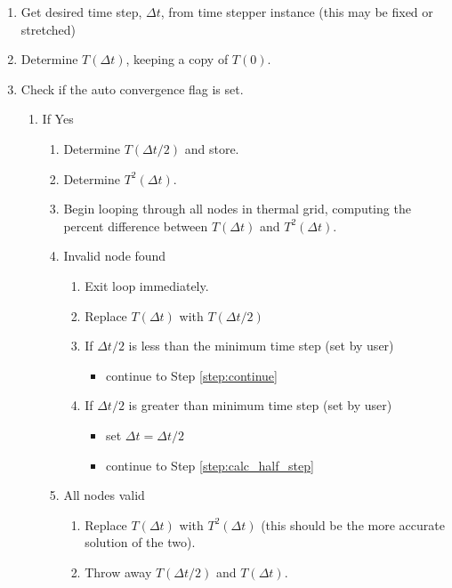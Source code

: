 \documentclass[letterpaper]{report}
\begin{document}
\begin{enumerate}
    \item Get desired time step, $\Delta t$, from time stepper instance (this may be fixed or stretched)
    \item Determine $T(\Delta t)$, keeping a copy of $T(0)$.
    \item Check if the auto convergence flag is set.
      \begin{enumerate}
        \item If Yes
        \begin{enumerate}
            \item \label{step:calc_half_step} Determine $T(\Delta t/2)$ and store.
            \item Determine $T^2(\Delta t)$.
            \item Begin looping through all nodes in thermal grid, computing the percent difference between $T(\Delta t)$ and $T^2(\Delta t)$.
            \item Invalid node found
              \begin{enumerate}
                  \item Exit loop immediately.
                  \item Replace $T(\Delta t)$ with $T(\Delta t /2)$
                  \item If $\Delta t / 2$ is less than the minimum time step (set by user)
                    \begin{itemize}
                      \item continue to Step \ref{step:continue}
                    \end{itemize}
                  \item If $\Delta t / 2$ is greater than minimum time step (set by user)
                    \begin{itemize}
                      \item set $\Delta t = \Delta t / 2$
                      \item continue to Step \ref{step:calc_half_step}
                    \end{itemize}
              \end{enumerate}
            \item All nodes valid
              \begin{enumerate}
                  \item Replace $T(\Delta t)$ with $T^2(\Delta t)$ (this should be the more accurate solution of the two).
                  \item Throw away $T(\Delta t/2)$ and $T(\Delta t)$.

\end{enumerate}
\end{enumerate}
\end{enumerate}
\end{enumerate}
\end{document}
